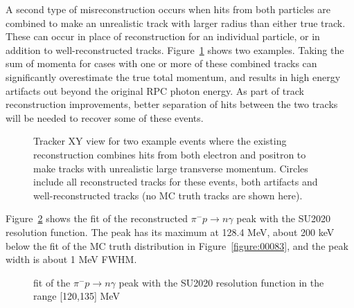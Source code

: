 A second type of misreconstruction occurs when hits from both
particles are combined to make an unrealistic track with larger radius
than either true track. These can occur in place of reconstruction for
an individual particle, or in addition to well-reconstructed
tracks. Figure~\ref{figure:he_artifact_evts} shows two
examples. Taking the sum of momenta for cases with one or more of
these combined tracks can significantly overestimate the true total
momentum, and results in high energy artifacts out beyond the original
RPC photon energy. As part of track reconstruction improvements,
better separation of hits between the two tracks will be needed to
recover some of these events.

\begin{figure}[H]
  \caption{
    \label{figure:he_artifact_evts}
    Tracker XY view for two example events where the existing
    reconstruction combines hits from both electron and positron to
    make tracks with unrealistic large transverse momentum. Circles
    include all reconstructed tracks for these events, both artifacts
    and well-reconstructed tracks (no MC truth tracks are shown here).
  }
\end{figure}

Figure~\ref{figure:00085_t2_1_smom_1_fit} shows the fit of the
reconstructed $\pi^- p \to n \gamma$ peak with the SU2020 resolution function.
The peak has its maximum at 128.4 MeV, about 200 keV below the fit
of the MC truth distribution in Figure~\ref{figure:00083},
and the peak width is about 1 MeV FWHM. 

\begin{figure}[H]
  \caption{
    \label{figure:00085_t2_1_smom_1_fit}
    fit of the $\pi^- p \to n \gamma$ peak with the SU2020 resolution function
    in the range [120,135] MeV
  }
\end{figure}

